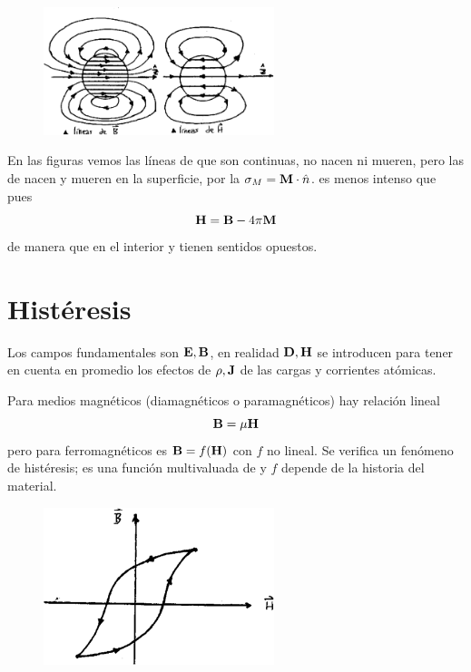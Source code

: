 \documentclass[10pt,oneside]{CBFT_book}
\begin{document}
\begin{figure}[htb]
	\begin{center}
	\includegraphics[width=0.6\textwidth]{images/fig_ft1_magnetiz1.pdf}	 
	\end{center}
	\caption{}
\end{figure} 

En las figuras vemos las líneas de  que son continuas, no nacen ni mueren, pero las
de  nacen y mueren en la superficie, por la $\sigma_M = \vb{M}\cdot\hat{n}$.
 es menos intenso que  pues
\[
	\vb{H} = \vb{B} - 4\pi \vb{M}
\]
de manera que en el interior  y  tienen sentidos opuestos.

\section{Histéresis}

Los campos fundamentales son $\vb{E},\vb{B}$, en realidad $\vb{D},\vb{H}$ se introducen para tener
en cuenta en promedio los efectos de $\rho, \vb{J}$ de las cargas y corrientes atómicas.

Para medios magnéticos (diamagnéticos o paramagnéticos) hay relación lineal
\[
	\vb{B} = \mu \vb{H}
\]
pero para ferromagnéticos es $\vb{B} = f(\vb{H})$ con $f$ no lineal. Se verifica un fenómeno
de histéresis;  es una función multivaluada de  y $f$ depende de la historia del material.

\begin{figure}[htb]
	\begin{center}
	\includegraphics[width=0.6\textwidth]{images/fig_ft1_magnetiz3.pdf}	 
	\end{center}
	\caption{}
\end{figure} 
\end{document}
